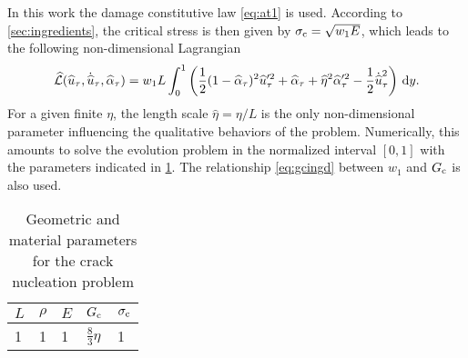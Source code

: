 In this work the damage constitutive law \eqref{eq:at1} is used. According to \cref{sec:ingredients}, the critical stress is then given by $\sigma_{\mathrm{c}}=\sqrt{w_1E}$, which leads to the following non-dimensional Lagrangian
\begin{equation} \label{eq:nondimensionalL}
\widehat{\mathcal{L}}(\widehat{u}_\tau,\dot{\widehat{u}}_\tau,\widehat{\alpha}_\tau)=w_1L\int_0^1\left(\frac{1}{2}(1-\widehat{\alpha}_\tau)^2\widehat{u}_\tau'^2+\widehat{\alpha}_\tau+\widehat{\eta}^2\widehat{\alpha}_\tau'^2-\frac{1}{2}\dot{\widehat{u}}_\tau^2\right)\,\mathrm{d}y.
\end{equation}
For a given finite $\eta$, the length scale $\widehat{\eta}=\eta/L$ is the only non-dimensional parameter influencing the qualitative behaviors of the problem. Numerically, this amounts to solve the evolution problem in the normalized interval $[0,1]$ with the parameters indicated in \cref{tab:para1d}. The relationship \eqref{eq:gcingd} between $w_1$ and $G_\mathrm{c}$ is also used.
\begin{table}[htbp]
\centering
\caption{Geometric and material parameters for the crack nucleation problem} \label{tab:para1d}
\begin{tabular}{lllll} \toprule
$L$ & $\rho$ & $E$ & $G_\mathrm{c}$ & $\sigma_{\mathrm{c}}$ \\ \midrule
1 & 1 & 1 & $\frac{8}{3}\eta$ & 1 \\ \bottomrule
\end{tabular}
\end{table}

